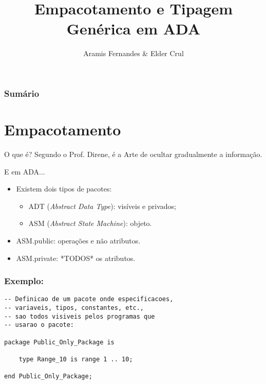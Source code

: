 \documentclass{beamer}
\title{Empacotamento e Tipagem Genérica em ADA}
\author{Aramis Fernandes \& Elder Crul}
\begin{document}
    \frame{\titlepage}

    \frame
    {
        \frametitle{Sumário}
        \tableofcontents
    }


    \section{Empacotamento}

    \begin{frame}{O que é?}
        Segundo o Prof. Direne, é a Arte de ocultar gradualmente a informação.
    \end{frame}

    \begin{frame}{E em ADA...}
        \begin{itemize}
            \item<1-> Existem dois tipos de pacotes:
            \begin{itemize}
                \item ADT (\textit{Abstract Data Type}): visíveis e privados;
                \item ASM (\textit{Abstract State Machine}): objeto.
            \end{itemize}
            \item<2-> ASM.public: operações e não atributos.
            \item<2-> ASM.private: *TODOS* os atributos.
        \end{itemize}
    \end{frame}

    \begin{frame}[containsverbatim]
    
        \frametitle{Exemplo:}
\begin{verbatim}
-- Definicao de um pacote onde especificacoes,
-- variaveis, tipos, constantes, etc.,
-- sao todos visiveis pelos programas que
-- usarao o pacote:

package Public_Only_Package is

    type Range_10 is range 1 .. 10;

end Public_Only_Package;
\end{verbatim}
    \end{frame}
\end{document}
